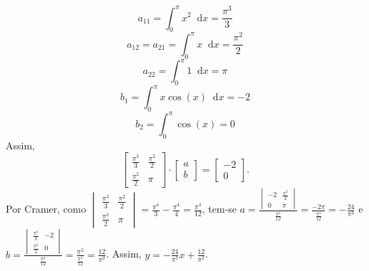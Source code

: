 \documentclass[12pt,a4paper]{article}
\newcommand*\diff{\mathop{}\!\mathrm{d}}
\begin{document}
\begin{enumerate}
\begin{enumerate}
   \[
      a_{11} = \int_0^\pi x^2 \diff{x} = \frac{\pi^3}{3}
   \]
   \[
      a_{12} = a_{21} = \int_0^\pi x \diff{x} = \frac{\pi^2}{2}
   \]
   \[
      a_{22} = \int_0^\pi 1 \diff{x} = \pi
   \]
   \[
      b_1 = \int_0^\pi x\cos(x) \diff{x} = -2
   \]
   \[
      b_2 = \int_0^\pi \cos(x) = 0
   \]
   Assim,
   \[
      \begin{bmatrix}
         \frac{\pi^3}{3} & \frac{\pi^2}{2} \\
         \frac{\pi^2}{2} & \pi
      \end{bmatrix}
      \cdot
      \begin{bmatrix}
         a \\
         b
      \end{bmatrix}
      =
      \begin{bmatrix}
         -2 \\
         0
      \end{bmatrix}.
   \]
   Por Cramer, como $\begin{vmatrix}
      \frac{\pi^3}{3} & \frac{\pi^2}{2} \\
      \frac{\pi^2}{2} & \pi
   \end{vmatrix} = \frac{\pi^4}{3} - \frac{\pi^4}{4} = \frac{\pi^4}{12}$, tem-se $a = \frac{\begin{vmatrix}
      -2 & \frac{\pi^2}{2} \\
      0 & \pi
   \end{vmatrix}}{\frac{\pi^4}{12}} = \frac{-2\pi}{\frac{\pi^4}{12}} = -\frac{24}{\pi^3}$ e  $b = \frac{\begin{vmatrix}
      \frac{\pi^3}{3} & -2 \\
      \frac{\pi^2}{2} & 0
   \end{vmatrix}}{\frac{\pi^4}{12}} = \frac{\pi^2}{\frac{\pi^4}{12}} = \frac{12}{\pi^2}$. Assim, $y = -\frac{24}{\pi^3} x + \frac{12}{\pi^2}$.
\end{enumerate}



\end{enumerate}
\end{document}

